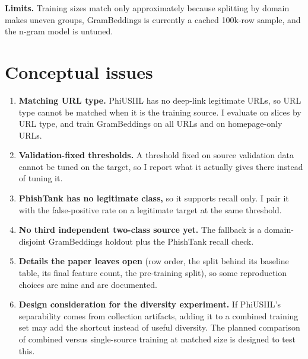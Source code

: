 \documentclass[10pt]{article}
\begin{document}
\textbf{Limits.} Training sizes match only approximately because splitting by domain makes uneven groups, GramBeddings is currently a cached 100k-row sample, and the n-gram model is untuned.

\section{Conceptual issues}
\begin{enumerate}
\setlength\itemsep{1pt}
\item \textbf{Matching URL type.} PhiUSIIL has no deep-link legitimate URLs, so URL type cannot be matched when it is the training source. I evaluate on slices by URL type, and train GramBeddings on all URLs and on homepage-only URLs.
\item \textbf{Validation-fixed thresholds.} A threshold fixed on source validation data cannot be tuned on the target, so I report what it actually gives there instead of tuning it.
\item \textbf{PhishTank has no legitimate class,} so it supports recall only. I pair it with the false-positive rate on a legitimate target at the same threshold.
\item \textbf{No third independent two-class source yet.} The fallback is a domain-disjoint GramBeddings holdout plus the PhishTank recall check.
\item \textbf{Details the paper leaves open} (row order, the split behind its baseline table, its final feature count, the pre-training split), so some reproduction choices are mine and are documented.
\item \textbf{Design consideration for the diversity experiment.} If PhiUSIIL's separability comes from collection artifacts, adding it to a combined training set may add the shortcut instead of useful diversity. The planned comparison of combined versus single-source training at matched size is designed to test this.
\end{enumerate}
\end{document}
